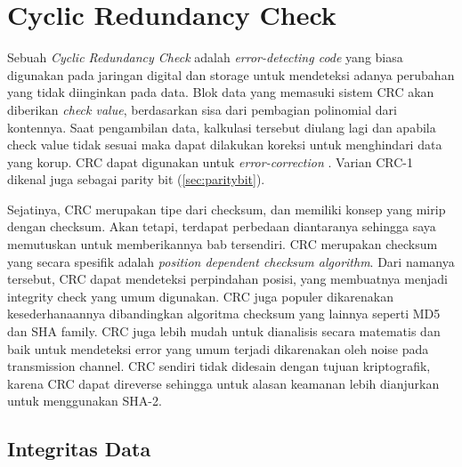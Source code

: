 \section{Cyclic Redundancy Check}
\label{sec:crc}



Sebuah \emph{Cyclic Redundancy Check} adalah \emph{error-detecting code} yang biasa digunakan pada jaringan digital dan storage untuk mendeteksi adanya perubahan yang tidak diinginkan pada data. Blok data yang memasuki sistem CRC akan diberikan \emph{check value}, berdasarkan sisa dari pembagian polinomial dari kontennya. Saat pengambilan data, kalkulasi tersebut diulang lagi dan apabila check value tidak sesuai maka dapat dilakukan koreksi untuk menghindari data yang korup. CRC dapat digunakan untuk \emph{error-correction} \citep{dobbs2003}. Varian CRC-1 dikenal juga sebagai parity bit (\ref{sec:paritybit}).

Sejatinya, CRC merupakan tipe dari checksum, dan memiliki konsep yang mirip dengan checksum. Akan tetapi, terdapat perbedaan diantaranya sehingga saya memutuskan untuk memberikannya bab tersendiri. CRC merupakan checksum yang secara spesifik adalah \emph{position dependent checksum algorithm}. Dari namanya tersebut, CRC dapat mendeteksi perpindahan posisi, yang membuatnya menjadi integrity check yang umum digunakan. CRC juga populer dikarenakan kesederhanaannya dibandingkan algoritma checksum yang lainnya seperti MD5 dan SHA family. CRC juga lebih mudah untuk dianalisis secara matematis dan baik untuk mendeteksi error yang umum terjadi dikarenakan oleh noise pada transmission channel. CRC sendiri tidak didesain dengan tujuan kriptografik, karena CRC dapat direverse sehingga untuk alasan keamanan lebih dianjurkan untuk menggunakan SHA-2.

\subsection{Integritas Data}
\label{subsec:crcdataintegrity}

